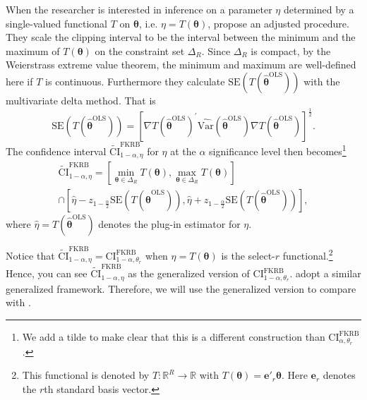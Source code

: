 When the researcher is interested in inference on a parameter $\eta$ determined by a single-valued functional $T$ on $\bm{\theta}$, i.e. $\eta = T(\bm{\theta})$, \citet{FoxKimRyanBajari2011} propose an adjusted procedure.
They scale the clipping interval to be the interval between the minimum and the maximum of $T(\bm{\theta})$ on the constraint set $\Delta_R$.
Since $\Delta_R$ is compact, by the Weierstrass extreme value theorem, the minimum and maximum are well-defined here if $T$ is continuous.
Furthermore they calculate $\mathrm{SE}(T(\hat{\bm{\theta}}^{\mathrm{OLS}}))$ with the multivariate delta method. That is
\begin{equation}
\label{eq:FKRBdeltamethod}
    \mathrm{SE}\left(T(\hat{\bm{\theta}}^{\mathrm{OLS}})\right) = \left[\nabla T\left(\hat{\bm{\theta}}^{\mathrm{OLS}}\right)^\prime \widehat{\mathrm{Var}}\left(\hat{\bm{\theta}}^{\mathrm{OLS}}\right) \nabla T\left(\hat{\bm{\theta}}^{\mathrm{OLS}}\right)\right]^{\frac{1}{2}}.
\end{equation}
The confidence interval $\widetilde{\mathrm{CI}}^{\mathrm{FKRB}}_{1-\alpha, \eta}$ for $\eta$ at the $\alpha$ significance level then becomes\footnote{We add a tilde to make clear that this is a different construction than $\mathrm{CI}_{\alpha,\theta_r}^{\mathrm{FKRB}}$.}
\begin{multline}
\label{eq:CIfunctional}
    \widetilde{\mathrm{CI}}^{\mathrm{FKRB}}_{1-\alpha,\eta} = \left[\min_{\bm{\theta}\in \Delta_R}{T(\bm{\theta})},\max_{\bm{\theta}\in \Delta_R}{T(\bm{\theta})}\right] \\
        \cap \left[\hat{\eta} -  z_{1-\frac{\alpha}{2}}\mathrm{SE}\left(T\left(\hat{\bm{\theta}}^{\mathrm{OLS}}\right)\right), \hat{\eta} +  z_{1-\frac{\alpha}{2}}\mathrm{SE}\left(T\left(\hat{\bm{\theta}}^{\mathrm{OLS}}\right)\right)\right],
\end{multline}
where $\hat{\eta} = T(\hat{\bm{\theta}}^\mathrm{OLS})$ denotes the plug-in estimator for $\eta$.

Notice that $\widetilde{\mathrm{CI}}^{\mathrm{FKRB}}_{1-\alpha,\eta} = \mathrm{CI}^{\mathrm{FKRB}}_{1-\alpha,\theta_r}$ when $\eta = T(\bm{\theta})$ is the select-$r$ functional.\footnote{This functional is denoted by $T: \mathbb{R}^R \to \mathbb{R}$ with $T(\bm{\theta}) = \bm{e}'_r \bm{\theta}$. Here $\bm{e}_r$ denotes the $r$th standard basis vector.}
Hence, you can see $\widetilde{\mathrm{CI}}^{\mathrm{FKRB}}_{1-\alpha,\eta}$ as the generalized version of $\mathrm{CI}^{\mathrm{FKRB}}_{1-\alpha,\theta_r}$.
\citet{ChenPouzo2015} adopt a similar generalized framework.
Therefore, we will use the generalized version to compare with \citet{ChenPouzo2015}.

